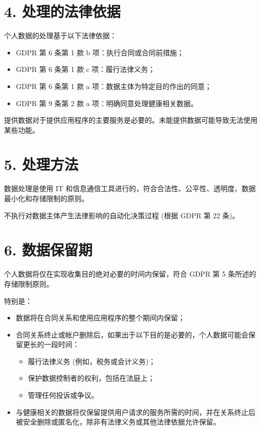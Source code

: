 \documentclass[a4paper,12pt]{article}
\begin{document}
    \section*{4. 处理的法律依据}

    个人数据的处理基于以下法律依据：

    \begin{itemize}
        \item GDPR 第 6 条第 1 款 b 项：执行合同或合同前措施；
        \item GDPR 第 6 条第 1 款 c 项：履行法律义务；
        \item GDPR 第 6 条第 1 款 a 项：数据主体为特定目的作出的同意；
        \item GDPR 第 9 条第 2 款 a 项：明确同意处理健康相关数据。
    \end{itemize}

    提供数据对于提供应用程序的主要服务是必要的。未能提供数据可能导致无法使用某些功能。

    \section*{5. 处理方法}

    数据处理是使用 IT 和信息通信工具进行的，符合合法性、公平性、透明度、数据最小化和存储限制的原则。

    不执行对数据主体产生法律影响的自动化决策过程 (根据 GDPR 第 22 条)。

    \section*{6. 数据保留期}

    个人数据将仅在实现收集目的绝对必要的时间内保留，符合 GDPR 第 5 条所述的存储限制原则。

    特别是：

    \begin{itemize}
        \item 数据将在合同关系和使用应用程序的整个期间内保留；

        \item 合同关系终止或帐户删除后，如果出于以下目的是必要的，个人数据可能会保留更长的一段时间：
        \begin{itemize}
            \item 履行法律义务 (例如，税务或会计义务)；
            \item 保护数据控制者的权利，包括在法庭上；
            \item 管理任何投诉或争议。
        \end{itemize}

        \item 与健康相关的数据将仅保留提供用户请求的服务所需的时间，并在关系终止后被安全删除或匿名化，除非有法律义务或其他法律依据允许保留。
    \end{itemize}
\end{document}
